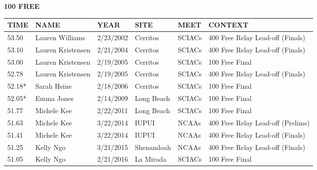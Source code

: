 \begin{minipage}[t]{0.48\textwidth}
\centering
\textbf{100 FREE}\\[0.05cm]
\begin{tabular}{@{}p{1.8cm}p{2.8cm}p{1.2cm}p{1.4cm}p{1.4cm}p{2.0cm}@{}}
\hline
\textbf{TIME} & \textbf{NAME} & \textbf{YEAR} & \textbf{SITE} & \textbf{MEET} & \textbf{CONTEXT} \\
\hline
53.50 & Lauren Williams & 2/23/2002 & Cerritos & SCIACs & 400 Free Relay Lead-off (Finals) \\
53.10 & Lauren Kristensen & 2/21/2004 & Cerritos & SCIACs & 400 Free Relay Lead-off (Finals) \\
53.00 & Lauren Kristensen & 2/19/2005 & Cerritos & SCIACs & 100 Free Final \\
52.78 & Lauren Kristensen & 2/19/2005 & Cerritos & SCIACs & 400 Free Relay Lead-off (Finals) \\
52.18* & Sarah Heine & 2/18/2006 & Cerritos & SCIACs & 100 Free Final  \\
52.05* & Emma Jones & 2/14/2009 & Long Beach & SCIACs & 100 Free Final  \\
51.77 & Michele Kee & 2/22/2011 & Long Beach & SCIACs & 100 Free Final  \\
51.63 & Michele Kee & 3/22/2014 & IUPUI & NCAAs & 400 Free Relay Lead-off (Prelims) \\
51.41 & Michele Kee & 3/22/2014 & IUPUI & NCAAs & 400 Free Relay Lead-off (Finals) \\
51.25 & Kelly Ngo & 3/21/2015 & Shenandoah & NCAAs & 400 Free Relay Lead-off (Finals) \\
51.05 & Kelly Ngo & 2/21/2016 & La Mirada & SCIACs & 100 Free Final \\
\hline
\end{tabular}
\end{minipage}

\vspace{0.4cm}

